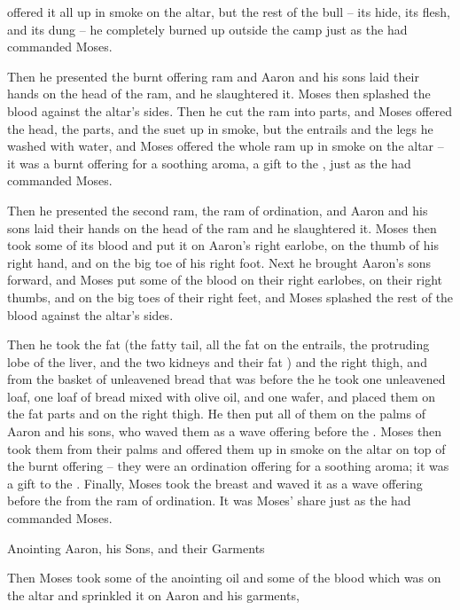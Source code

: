 {offered it all up in smoke
on the altar,
but the rest of the bull
– its hide,
its flesh,
and its dung
– he completely burned up
outside
the camp
just
as the
{}
had commanded
Moses.
\par }{\PP {}Then he presented
the burnt offering
ram
and Aaron
and his sons
laid
their hands
on
the head
of the ram,
and he slaughtered
it. Moses
then splashed
the blood
against
the altar’s
sides.
Then
he cut
the ram
into parts,
and Moses
offered
the head,
the parts,
and the suet up in smoke,
but the entrails
and the
legs
he washed
with water,
and Moses
offered
the
whole
ram
up in smoke on the altar
– it was
a burnt offering
for a soothing
aroma,
a gift
to the
{}, just
as the
{}
had commanded
Moses.
\par }{\PP {}Then he presented
the second
ram,
the ram
of ordination,
and Aaron
and his
sons
laid their hands
on
the head
of the ram
and he slaughtered
it. Moses
then took
some of its blood
and put
it on
Aaron’s
right
earlobe,
on
the thumb
of his right
hand,
and on
the big toe
of his right
foot.
Next he brought
Aaron’s
sons
forward, and Moses
put
some
of the blood
on
their right
earlobes,
on
their right
thumbs,
and on
the big toes
of their right
feet,
and Moses
splashed
the rest of the blood
against
the altar’s
sides.
\par }{\PP {}Then he took
the
fat
(the
fatty tail,
all
the fat
on
the entrails,
the
protruding lobe
of the liver,
and the
two
kidneys
and their fat
) and the
right
thigh,
and from the basket
of unleavened
bread that
was before
the {}
he took
one unleavened
loaf,
one
loaf
of bread
mixed with olive oil,
and one
wafer,
and placed
them on
the fat
parts and on
the right
thigh.
He then put
all
of them on
the palms
of Aaron
and his sons,
who waved
them as a wave offering
before
the {}.
Moses
then took
them from their palms
and offered them up in smoke
on the altar
on
top of the burnt offering
– they were
an ordination
offering for a soothing
aroma;
it was
a gift
to the
{}.
Finally, Moses
took
the breast
and waved
it as a wave offering
before
the {}
from the ram
of ordination.
It was Moses’
share
just
as the
{}
had commanded
Moses.
\par }{\SH Anointing Aaron, his Sons, and their Garments
\par }{\PP {}Then Moses
took
some of the anointing
oil
and some
of the blood
which
was on
the altar
and sprinkled
it on
Aaron
and his garments,
}
